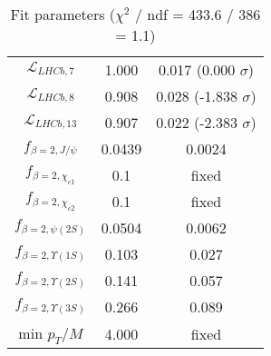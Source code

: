 \begin{table}[h!]
\begin{tabular}{c|c|c}
$\mathcal L_{LHCb,7}$ & 1.000 & 0.017 (0.000 $\sigma$) \\
$\mathcal L_{LHCb,8}$ & 0.908 & 0.028 (-1.838 $\sigma$) \\
$\mathcal L_{LHCb,13}$ & 0.907 & 0.022 (-2.383 $\sigma$) \\
$f_{\beta=2,J/\psi}$ & 0.0439 & 0.0024 \\
$f_{\beta=2,\chi_{c1}}$ & 0.1 & fixed \\
$f_{\beta=2,\chi_{c2}}$ & 0.1 & fixed \\
$f_{\beta=2,\psi(2S)}$ & 0.0504 & 0.0062 \\
$f_{\beta=2,\Upsilon(1S)}$ & 0.103 & 0.027 \\
$f_{\beta=2,\Upsilon(2S)}$ & 0.141 & 0.057 \\
$f_{\beta=2,\Upsilon(3S)}$ & 0.266 & 0.089 \\
min $p_T/M$ & 4.000 & fixed \\
\end{tabular}
\caption{Fit parameters ($\chi^2$ / ndf = 433.6 / 386 = 1.1)}
\end{table}
